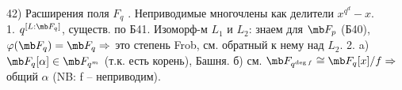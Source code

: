 42) Расширения поля $F_q$ . Неприводимые многочлены как делители $x^{q^d} - x$.\\
1. $q^{[L:\mb F_q]}$, существ. по Б41. Изоморф-м $L_1$ и $L_2$: знаем для $\mb F_p$ (Б40), $\varphi(\mb F_q) = \mb F_q \Rightarrow$ это степень Frob, см. обратный к нему над $L_2$. 2. a) $\mb F_q[\alpha] \in \mb F_{q^m}$ (т.к. есть корень), Башня. б) см. $\mb F_{q^{\deg f}} \cong \mb F_q[x]/f\Rightarrow$ общий $\alpha$ (NB: f -- неприводим).
\\

